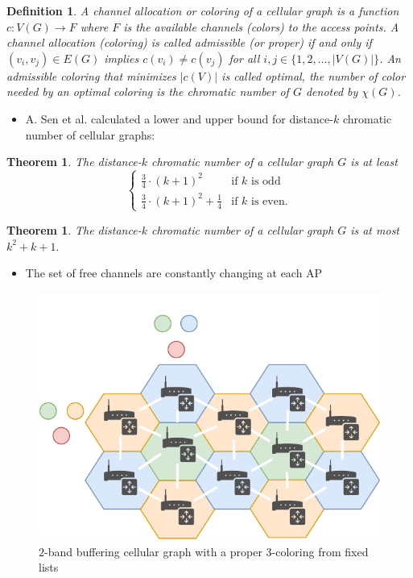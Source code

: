 \documentclass{beamer} %
\newtheorem{theo}[lem]{Theorem}
\newtheorem{defi}[lem]{Definition}
\begin{document}
\begin{frame}[allowframebreaks]
\begin{defi}
A channel allocation or coloring of a cellular graph is a function $c\colon V(G) \to F$ where $F$ is the available channels (colors) to the access points. A channel allocation (coloring) is called admissible (or proper) if and only if $(v_i,v_j) \in E(G)$ implies $c(v_i) \neq c(v_j)$ for all $i,j \in \lbrace 1, 2, \ldots, |V(G)| \rbrace$. An admissible coloring that minimizes $|c(V)|$ is called optimal, the number of color needed by an optimal coloring is the chromatic number of $G$ denoted by $\chi(G)$.
\end{defi}
\framebreak
\begin{itemize}
\item A. Sen et al. \cite{662943} calculated a lower and upper bound for distance-$k$ chromatic number of cellular graphs:
\end{itemize}

\begin{theo} The distance-$k$ chromatic number of a cellular graph $G$ is at least
\[ \begin{cases} 
      \frac{3}{4} \cdot (k+1)^2 & \text{if $k$ is odd} \\
      \frac{3}{4} \cdot (k+1)^2 + \frac{1}{4} & \text{if $k$ is even}.
   \end{cases}
\]
\end{theo}

\begin{theo} The distance-$k$ chromatic number of a cellular graph $G$ is at most $k^2 + k + 1.$
\end{theo}
\framebreak
\begin{itemize}
\item The set of free channels are constantly changing at each AP
\end{itemize}

\begin{figure}
\centering
\includegraphics[scale=0.6]{figures/hexagonal-topology-wifi-list.pdf}
\caption{$2$-band buffering cellular graph with a proper 3-coloring from fixed lists}\label{fig:cellular-graph-list}
\end{figure}


\end{frame}
\end{document}
